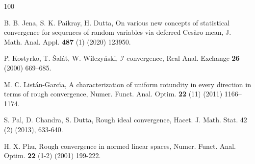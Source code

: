 \documentclass[reqno]{amsart}
\begin{document}
\begin{thebibliography}{100}
		
		
		
		 B. B. Jena, S. K. Paikray, H. Dutta, On various new concepts of statistical convergence for sequences of random variables via deferred Ces{\`a}ro mean, J. Math. Anal. Appl. \textbf{487} (1) (2020) {123950}.
		
		
		
		
		 P. Kostyrko, T. {\v{S}}al{\'a}t, W. Wilczy{\'n}ski, $\mathcal{I}$-convergence, Real Anal. Exchange {\textbf{26}} (2000) {669--685}.
		
		 M. C. List{\'a}n-Garc{\'\i}a, A characterization of uniform rotundity in every direction in terms of rough convergence, Numer. Funct. Anal. Optim. {\textbf{22}} (11) (2011) 1166--1174. 
		
		
		
		
		
		 S. Pal, D. Chandra, S. Dutta, Rough ideal convergence,  Hacet. J. Math. Stat. {42} (2) (2013), 633-640.
		
		  H. X. Phu, Rough convergence in normed linear spaces, Numer. Funct. Anal. Optim. {\textbf{22}} (1-2) (2001) 199-222.
		

\end{thebibliography}
\end{document}
